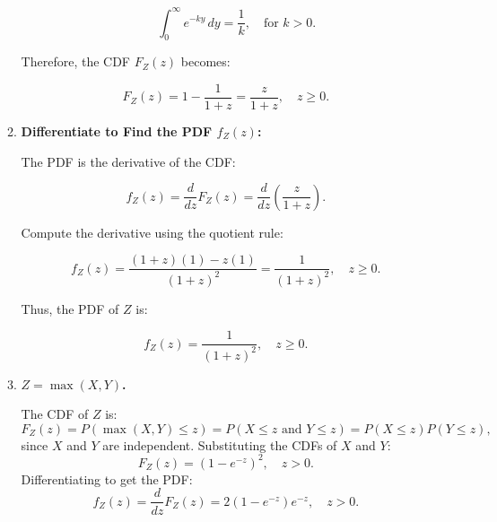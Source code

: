 \documentclass[a4paper, 8pt]{article}
\begin{document}
\begin{enumerate}[label=\alph*)]
\begin{enumerate}[label=\roman*)]
\begin{enumerate}[label=(\alph*)]
                              \[
                                  \int_{0}^{\infty} e^{-k y} \, dy = \frac{1}{k}, \quad \text{for } k > 0.
                              \]
                    \end{enumerate}

                    Therefore, the CDF \( F_Z(z) \) becomes:

                    \[
                        F_Z(z) = 1 - \frac{1}{1 + z} = \frac{z}{1 + z}, \quad z \geq 0.
                    \]

              \item \textbf{Differentiate to Find the PDF \( f_Z(z) \):}

                    The PDF is the derivative of the CDF:

                    \[
                        f_Z(z) = \frac{d}{dz} F_Z(z) = \frac{d}{dz} \left( \frac{z}{1 + z} \right).
                    \]

                    Compute the derivative using the quotient rule:

                    \[
                        f_Z(z) = \frac{(1 + z)(1) - z(1)}{(1 + z)^2} = \frac{1}{(1 + z)^2}, \quad z \geq 0.
                    \]

                    Thus, the PDF of \( Z \) is:

                    \[
                        f_Z(z) = \frac{1}{(1 + z)^2}, \quad z \geq 0.
                    \]

              \item \textbf{$Z = \max(X, Y)$.}

                    The CDF of $Z$ is:
                    \[
                        F_Z(z) = P(\max(X, Y) \leq z) = P(X \leq z \text{ and } Y \leq z) = P(X \leq z) P(Y \leq z),
                    \]
                    since $X$ and $Y$ are independent. Substituting the CDFs of $X$ and $Y$:
                    \[
                        F_Z(z) = (1 - e^{-z})^2, \quad z > 0.
                    \]
                    Differentiating to get the PDF:
                    \[
                        f_Z(z) = \frac{d}{dz} F_Z(z) = 2(1 - e^{-z})e^{-z}, \quad z > 0.
                    \]

          \end{enumerate}
\end{enumerate}
\end{document}
